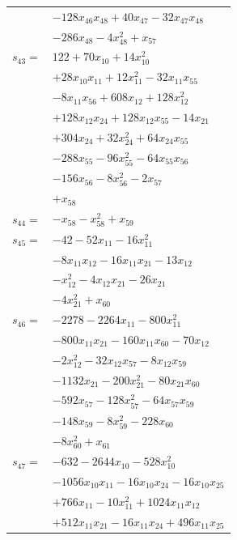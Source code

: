 \begin{longtable}{@{}r@{\;}l@{}}
 & \(\displaystyle -128x_{46}x_{48} +40x_{47} -32x_{47}x_{48}\) \\
 & \(\displaystyle -286x_{48} -4x_{48}^{2} +x_{57}\) \\[3pt]
\(s_{43}=\) & \(\displaystyle 122 +70x_{10} +14x_{10}^{2}\) \\
 & \(\displaystyle +28x_{10}x_{11} +12x_{11}^{2} -32x_{11}x_{55}\) \\
 & \(\displaystyle -8x_{11}x_{56} +608x_{12} +128x_{12}^{2}\) \\
 & \(\displaystyle +128x_{12}x_{24} +128x_{12}x_{55} -14x_{21}\) \\
 & \(\displaystyle +304x_{24} +32x_{24}^{2} +64x_{24}x_{55}\) \\
 & \(\displaystyle -288x_{55} -96x_{55}^{2} -64x_{55}x_{56}\) \\
 & \(\displaystyle -156x_{56} -8x_{56}^{2} -2x_{57}\) \\
 & \(\displaystyle +x_{58}\) \\[3pt]
\(s_{44}=\) & \(\displaystyle -x_{58} -x_{58}^{2} +x_{59}\) \\[3pt]
\(s_{45}=\) & \(\displaystyle -42 -52x_{11} -16x_{11}^{2}\) \\
 & \(\displaystyle -8x_{11}x_{12} -16x_{11}x_{21} -13x_{12}\) \\
 & \(\displaystyle -x_{12}^{2} -4x_{12}x_{21} -26x_{21}\) \\
 & \(\displaystyle -4x_{21}^{2} +x_{60}\) \\[3pt]
\(s_{46}=\) & \(\displaystyle -2278 -2264x_{11} -800x_{11}^{2}\) \\
 & \(\displaystyle -800x_{11}x_{21} -160x_{11}x_{60} -70x_{12}\) \\
 & \(\displaystyle -2x_{12}^{2} -32x_{12}x_{57} -8x_{12}x_{59}\) \\
 & \(\displaystyle -1132x_{21} -200x_{21}^{2} -80x_{21}x_{60}\) \\
 & \(\displaystyle -592x_{57} -128x_{57}^{2} -64x_{57}x_{59}\) \\
 & \(\displaystyle -148x_{59} -8x_{59}^{2} -228x_{60}\) \\
 & \(\displaystyle -8x_{60}^{2} +x_{61}\) \\[3pt]
\(s_{47}=\) & \(\displaystyle -632 -2644x_{10} -528x_{10}^{2}\) \\
 & \(\displaystyle -1056x_{10}x_{11} -16x_{10}x_{24} -16x_{10}x_{25}\) \\
 & \(\displaystyle +766x_{11} -10x_{11}^{2} +1024x_{11}x_{12}\) \\
 & \(\displaystyle +512x_{11}x_{21} -16x_{11}x_{24} +496x_{11}x_{25}\) \\

\end{longtable}
